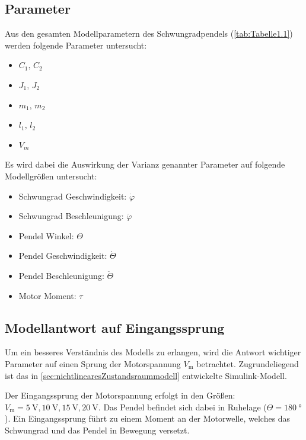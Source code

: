 \subsection{Parameter}
Aus den gesamten Modellparametern des Schwungradpendels (\ref{tab:Tabelle1.1}) werden folgende Parameter untersucht:
\begin{itemize}
    \item $C_1,\, C_2$
    \item $J_1,\, J_2$
    \item $m_1,\, m_2$
    \item $l_1,\, l_2$
    \item $V_m$
\end{itemize}
Es wird dabei die Auswirkung der Varianz genannter Parameter auf folgende Modellgrößen untersucht:
\begin{itemize}
    \item Schwungrad Geschwindigkeit: $\dot\varphi$
    \item Schwungrad Beschleunigung: $\ddot\varphi$
    \item Pendel Winkel: $\Theta$
    \item Pendel Geschwindigkeit: $\dot\Theta$
    \item Pendel Beschleunigung: $\ddot\Theta$
    \item Motor Moment: $\tau$
\end{itemize}


\subsection*{Modellantwort auf Eingangssprung}

Um ein besseres Verständnis des Modells zu erlangen, wird die Antwort wichtiger Parameter auf einen Sprung der Motorspannung $V_{\mathrm{m}}$ betrachtet.
Zugrundeliegend ist das in \ref{sec:nichtlinearesZustandsraummodell} entwickelte Simulink-Modell.

Der Eingangssprung der Motorspannung erfolgt in den Größen: $V_{\mathrm{m}}=\SI{5}{\volt},\SI{10}{\volt},\SI{15}{\volt},\SI{20}{\volt}$.
Das Pendel befindet sich dabei in Ruhelage ($\Theta=\SI{180}{\degree}$). 
Ein Eingangssprung führt zu einem Moment an der Motorwelle, welches das Schwungrad und das Pendel in Bewegung versetzt.\\

